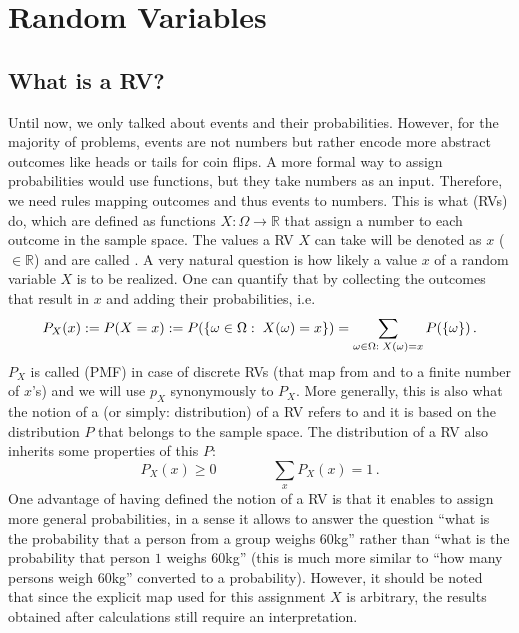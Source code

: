 \newpage



\section{Random Variables}
	\subsection{What is a RV?}
Until now, we only talked about events and their probabilities. However, for the majority of problems, events are not numbers but rather encode more abstract outcomes like heads or tails for coin flips. %
A more formal way to assign probabilities would use functions, but they take numbers as an input. Therefore, we need rules mapping outcomes and thus events to numbers.
This is what  (RVs) do, which are defined as functions $X: \Omega \rightarrow \mathbb{R}$ that assign a number to each outcome in the sample space. The values a RV $X$ can take will be denoted as $x$ ($\in \mathbb{R}$) and are called . A very natural question is how likely a value $x$ of a random variable $X$ is to be realized. One can quantify that by collecting the outcomes that result in $x$ and adding their probabilities, i.e.
\begin{equation}\label{eq:RV_distr}
P_X(x) := P(X = x) := P(\qty{\omega \in \Omega: \; X(\omega) = x}) = \sum_{\omega \in \Omega: \; X(\omega) = x} P(\qty{\omega}) \, .
\end{equation}
$P_X$ is called  (PMF) in case of discrete RVs (that map from and to a finite number of $x$'s) and we will use $p_X$ synonymously to $P_X$. More generally, this is also what the notion of a  (or simply: distribution) of a RV refers to and it is based on the distribution $P$ that belongs to the sample space. The distribution of a RV also inherits some properties of this $P$:
\begin{equation}
P_X(x) \geq 0 \qquad \qquad \sum_x P_X(x) = 1 \, .
\end{equation}
One advantage of having defined the notion of a RV is that it enables to assign more general probabilities, in a sense it allows to answer the question \enquote{what is the probability that a person from a group weighs $60$kg} rather than \enquote{what is the probability that person $1$ weighs $60$kg} (this is much more similar to \enquote{how many persons weigh $60$kg} converted to a probability). However, it should be noted that since the explicit map used for this assignment $X$ is arbitrary, the results obtained after calculations still require an interpretation.

